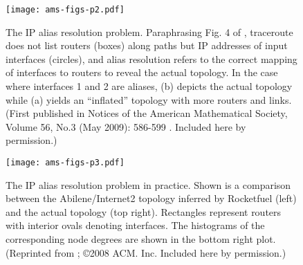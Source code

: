 \begin{figure}[htb] 
  \begin{center}
    \texttt{[image: ams-figs-p2.pdf]}
    \caption{The IP alias resolution problem. Paraphrasing Fig. 4 of \cite{rocketfuel_1}, 
	 traceroute does not list routers (boxes) along paths but IP addresses of 
	 input interfaces (circles), and alias resolution refers to the correct 
	 mapping of interfaces to routers to reveal the actual topology. In the case
	 where interfaces 1 and 2 are aliases, (b) depicts the actual topology while 
	 (a) yields an ``inflated'' topology with more routers and links.
	 (First published in Notices of the American Mathematical Society, Volume 56, 
	 No.3 (May 2009): 586-599 \cite{willinger09:_mathem_and_inter}. Included here by permission.)
      \label{fig:hot_2}}
  \end{center}
\end{figure}         

\begin{figure}[thbp] 
  \begin{center}
    \texttt{[image: ams-figs-p3.pdf]}
    \caption{The IP alias resolution problem in practice. Shown is a comparison 
	 between the Abilene/Internet2 topology inferred by Rocketfuel (left) and the 
	 actual topology (top right). Rectangles represent routers with interior ovals 
	 denoting interfaces. The histograms of the corresponding node degrees are 
	 shown in the bottom right plot. 
	 (Reprinted from \cite{sherwood08:_discar}; \copyright 2008
         ACM. Inc. Included here by permission.)
         \label{fig:hot_3}}
  \end{center}
\end{figure}         


